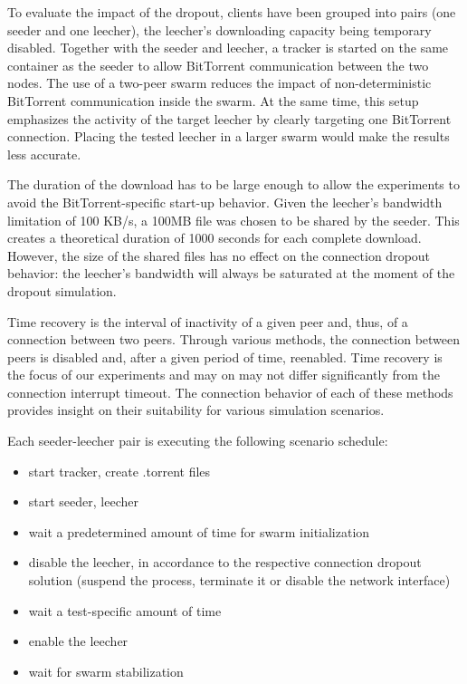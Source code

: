 To evaluate the impact of the dropout, clients have been grouped into pairs
(one seeder and one leecher), the leecher's downloading capacity being
temporary disabled. Together with the seeder and leecher, a tracker is started
on the same container as the seeder to allow BitTorrent communication between
the two nodes. The use of a two-peer swarm reduces the impact of
non-deterministic BitTorrent communication inside the swarm. At the same time,
this setup emphasizes the activity of the target leecher by clearly targeting
one BitTorrent connection. Placing the tested leecher in a larger swarm would
make the results less accurate.

The duration of the download has to be large enough to allow the experiments
to avoid the BitTorrent-specific start-up behavior. Given the leecher's
bandwidth limitation of 100 KB/s, a 100MB file was chosen to be shared by the
seeder. This creates a theoretical duration of 1000 seconds for each complete
download. However, the size of the shared files has no effect on the
connection dropout behavior: the leecher's bandwidth will always be saturated
at the moment of the dropout simulation.

Time recovery is the interval of inactivity of a given peer and, thus, of a
connection between two peers. Through various methods, the connection between
peers is disabled and, after a given period of time, reenabled. Time recovery
is the focus of our experiments and may on may not differ significantly from
the connection interrupt timeout. The connection behavior of each of these
methods provides insight on their suitability for various simulation
scenarios.

Each seeder-leecher pair is executing the following scenario schedule:

\begin{itemize}
  \item start tracker, create .torrent files
  \item start seeder, leecher
  \item wait a predetermined amount of time for swarm initialization
  \item disable the leecher, in accordance to the respective connection
  dropout solution (suspend the process, terminate it or disable the network
  interface)
  \item wait a test-specific amount of time
  \item enable the leecher
  \item wait for swarm stabilization
\end{itemize}

